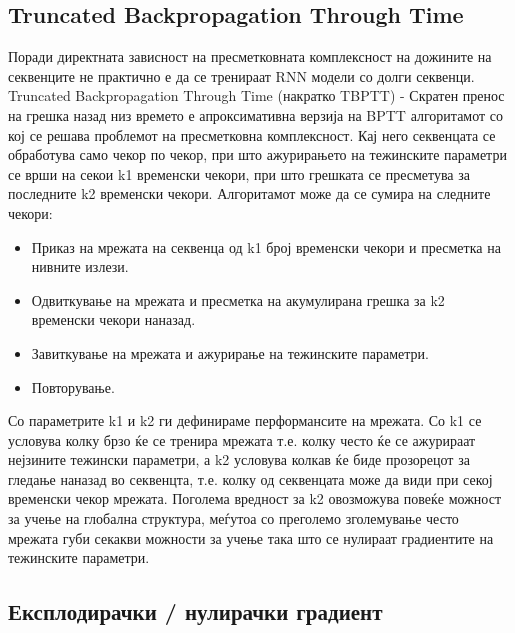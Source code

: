 \subsection{Truncated Backpropagation Through Time}

Поради директната зависност на пресметковната комплексност на дожините на секвенците не практично е да се тренираат RNN модели со долги секвенци. Truncated Backpropagation Through Time (накратко TBPTT) - Скратен пренос на грешка назад низ времето е апроксимативна верзија на BPTT алгоритамот со кој се решава проблемот на пресметковна комплексност. Кај него секвенцата се обработува само чекор по чекор, при што ажурирањето на тежинските параметри се врши на секои k1 временски чекори, при што грешката се пресметува за последните k2 временски чекори. Алгоритамот може да се сумира на следните чекори:
\begin{itemize}
    \item Приказ на мрежата на секвенца од k1 број временски чекори и пресметка на нивните излези.
    \item Одвиткување на мрежата и пресметка на акумулирана грешка за k2 временски чекори наназад.
    \item Завиткување на мрежата и ажурирање на тежинските параметри.
    \item Повторување.
\end{itemize}

Со параметрите k1 и k2 ги дефинираме перформансите на мрежата. Со k1 се условува колку брзо ќе се тренира мрежата т.е. колку често ќе се ажурираат нејзините тежински параметри, а k2 условува колкав ќе биде прозорецот за гледање наназад во секвенцта, т.е. колку од секвенцата може да види при секој временски чекор мрежата. Поголема вредност за k2 овозможува повеќе можност за учење на глобална структура, меѓутоа со преголемо зголемување често мрежата губи секакви можности за учење така што се нулираат градиентите на тежинските параметри.

\subsection{Експлодирачки / нулирачки градиент}

